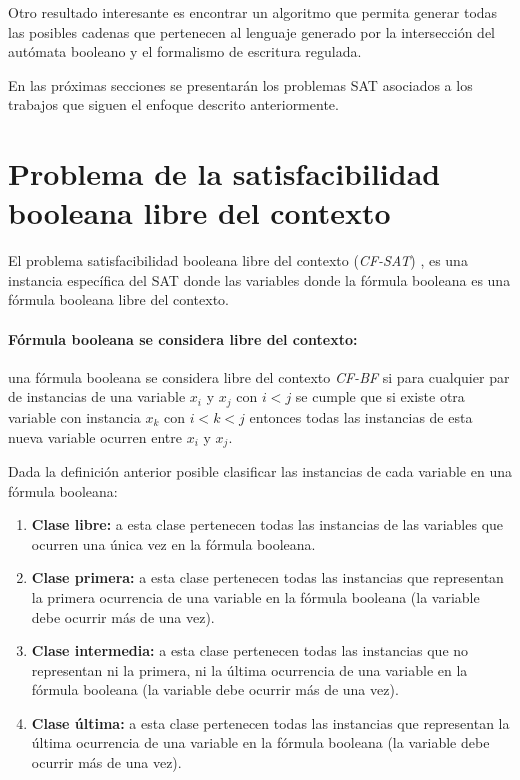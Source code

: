 \documentclass{article}
\begin{document}
Otro resultado interesante es encontrar un algoritmo que permita generar todas las posibles cadenas que pertenecen al lenguaje
generado por la intersección del autómata booleano y el formalismo de escritura regulada.

En las próximas secciones se presentarán los problemas SAT asociados a los trabajos que siguen el enfoque descrito anteriormente.

\section{Problema de la satisfacibilidad booleana libre del contexto}

El problema satisfacibilidad booleana libre del contexto (\textit{CF-SAT}) \cite{aCFSAT}, es una instancia específica
del SAT donde las variables donde la fórmula booleana es una fórmula booleana libre del contexto.

\paragraph{Fórmula booleana se considera libre del contexto:} una fórmula booleana se considera libre del contexto
\textit{CF-BF} si para cualquier par de instancias de una variable $x_i$ y $x_j$ con $i<j$ se
cumple que si existe otra variable con instancia $x_k$ con $i<k<j$ entonces todas las instancias de esta nueva
variable ocurren entre $x_i$ y $x_j$.

Dada la definición anterior posible clasificar las instancias de cada variable en una fórmula booleana:

\begin{enumerate}
      \item \textbf{Clase libre:} a esta clase pertenecen todas las instancias de las variables que ocurren
            una única vez en la fórmula booleana.
      \item \textbf{Clase primera:} a esta clase pertenecen todas las instancias que representan la primera
            ocurrencia de una variable en la fórmula booleana (la variable debe ocurrir más de una vez).
      \item \textbf{Clase intermedia:} a esta clase pertenecen todas las instancias que no representan ni la primera, ni la última
            ocurrencia de una variable en la fórmula booleana (la variable debe ocurrir más de una vez).
      \item \textbf{Clase última:} a esta clase pertenecen todas las instancias que representan la última
            ocurrencia de una variable en la fórmula booleana (la variable debe ocurrir más de una vez).
\end{enumerate}
\end{document}
